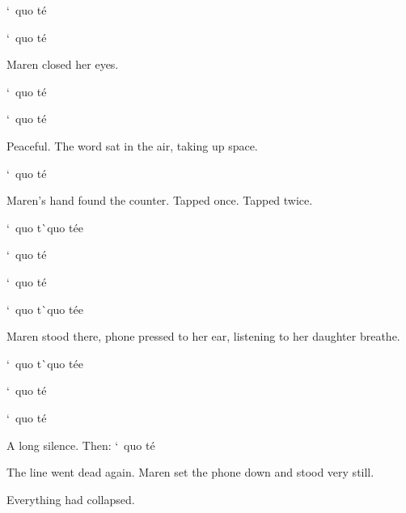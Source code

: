 \documentclass[12pt,letterpaper,openany]{book}
\begin{document}
`\ quo t\'e{}
\par
`\ quo t\'e{}
\par
Maren closed her eyes.
\par
`\ quo t\'e{}
\par
`\ quo t\'e{}
\par
Peaceful. The word sat in the air, taking up space.
\par
 `\ quo t\'e{}
\par
Maren's hand found the counter. Tapped once. Tapped twice.
\par
`\ quo t\`\ quo t\'e{}e{}
\par
`\ quo t\'e{}
\par
`\ quo t\'e{}
\par
`\ quo t\`\ quo t\'e{}e{}
\par
Maren stood there, phone pressed to her ear, listening to her daughter breathe. 
\par
`\ quo t\`\ quo t\'e{}e{}
\par
`\ quo t\'e{}
\par
`\ quo t\'e{}
\par
A long silence. Then: `\ quo t\'e{}
\par
The line went dead again. Maren set the phone down and stood very still.
\par
Everything had collapsed.
\par
\end{document}
